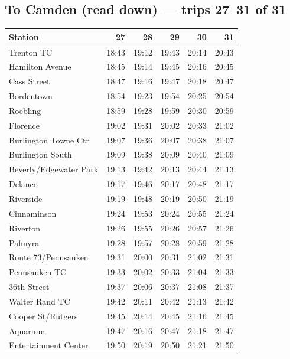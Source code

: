 \subsection*{To Camden (read down) --- trips 27--31 of 31}
\begin{center}\footnotesize\setlength{\tabcolsep}{3pt}\begin{tabular}{@{}lrrrrr@{}}\toprule
Station & 27 & 28 & 29 & 30 & 31 \\\midrule
Trenton TC & 18:43 & 19:12 & 19:43 & 20:14 & 20:43 \\
Hamilton Avenue & 18:45 & 19:14 & 19:45 & 20:16 & 20:45 \\
Cass Street & 18:47 & 19:16 & 19:47 & 20:18 & 20:47 \\
Bordentown & 18:54 & 19:23 & 19:54 & 20:25 & 20:54 \\
Roebling & 18:59 & 19:28 & 19:59 & 20:30 & 20:59 \\
Florence & 19:02 & 19:31 & 20:02 & 20:33 & 21:02 \\
Burlington Towne Ctr & 19:07 & 19:36 & 20:07 & 20:38 & 21:07 \\
Burlington South & 19:09 & 19:38 & 20:09 & 20:40 & 21:09 \\
Beverly/Edgewater Park & 19:13 & 19:42 & 20:13 & 20:44 & 21:13 \\
Delanco & 19:17 & 19:46 & 20:17 & 20:48 & 21:17 \\
Riverside & 19:19 & 19:48 & 20:19 & 20:50 & 21:19 \\
Cinnaminson & 19:24 & 19:53 & 20:24 & 20:55 & 21:24 \\
Riverton & 19:26 & 19:55 & 20:26 & 20:57 & 21:26 \\
Palmyra & 19:28 & 19:57 & 20:28 & 20:59 & 21:28 \\
Route 73/Pennsauken & 19:31 & 20:00 & 20:31 & 21:02 & 21:31 \\
Pennsauken TC & 19:33 & 20:02 & 20:33 & 21:04 & 21:33 \\
36th Street & 19:37 & 20:06 & 20:37 & 21:08 & 21:37 \\
Walter Rand TC & 19:42 & 20:11 & 20:42 & 21:13 & 21:42 \\
Cooper St/Rutgers & 19:45 & 20:14 & 20:45 & 21:16 & 21:45 \\
Aquarium & 19:47 & 20:16 & 20:47 & 21:18 & 21:47 \\
Entertainment Center & 19:50 & 20:19 & 20:50 & 21:21 & 21:50 \\
\bottomrule\end{tabular}\end{center}
\clearpage
